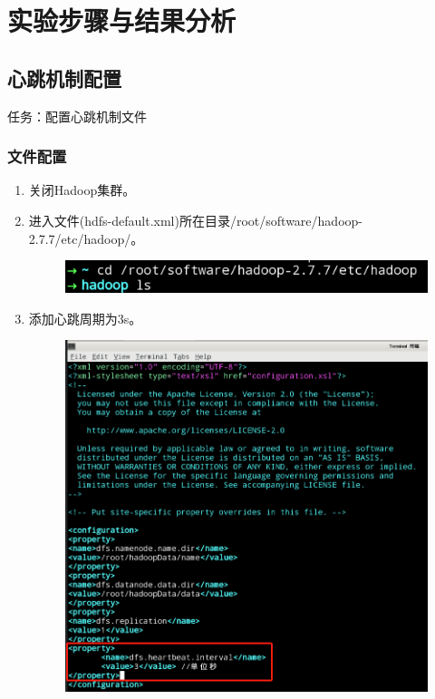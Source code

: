 \documentclass {article}
\begin{document}
	\section{实验步骤与结果分析}
		\subsection{心跳机制配置}
			任务：配置心跳机制文件
			\subsubsection{文件配置}
				\begin{enumerate}
					\item 关闭Hadoop集群。
					\item 进入文件(hdfs-default.xml)所在目录/root/software/hadoop-2.7.7/etc/hadoop/。
					\begin{figure}[H]
						\centering
						\includegraphics{figures/fig1.png}
					\end{figure}
				
					\item 添加心跳周期为3s。
					\begin{figure}[H]
						\centering
						\includegraphics[width=4.5in]{figures/fig2.png}
					\end{figure}
				

\end{enumerate}
\end{document}
